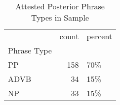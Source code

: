 \begin{table}[htbp!]
\centering
\caption{Attested Posterior Phrase Types in Sample}
\label{table:post_phtype_ct}
\begin{tabular}{lrl}
\toprule
{} &  count & percent \\
Phrase Type &        &         \\
\midrule
PP          &    158 &     70\% \\
ADVB        &     34 &     15\% \\
NP          &     33 &     15\% \\
\bottomrule
\end{tabular}
\end{table}
